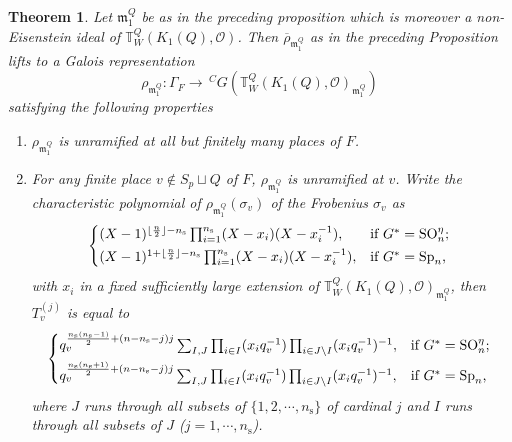 \documentclass[12pt,oneside,reqno]{amsart}
\theoremstyle{plain}
\newtheorem{theorem}{Theorem}[section]
\begin{document}
	
	\begin{theorem}\label{Galois representation valued in Hecke algebra-char=0}
		Let
		$\mathfrak{m}_1^Q$
		be as in the preceding proposition which is moreover
		a non-Eisenstein ideal of
		$\mathbb{T}_W^{Q}(K_1(Q),\mathcal{O})$. 
		Then
		$\overline{\rho}_{\mathfrak{m}_1^Q}$
		as in the preceding
		Proposition
		lifts to a Galois representation
		\[
		\rho_{\mathfrak{m}_1^Q}
		\colon
		\Gamma_F
		\rightarrow
		\,^CG
		\left(
		\mathbb{T}_W^{Q}(K_1(Q),\mathcal{O})_{\mathfrak{m}_1^Q}
		\right)
		\]
		satisfying the following properties
		\begin{enumerate}
			\item 
			$\rho_{\mathfrak{m}_1^Q}$
			is unramified at all but finitely many places of $F$.
			
			
			\item 
			For any finite place
			$v\notin S_p\sqcup Q$ of $F$,
			$\rho_{\mathfrak{m}_1^Q}$
			is unramified at $v$.
			Write the characteristic polynomial
			of
			$\rho_{\mathfrak{m}_1^Q}(\sigma_v)$
			of the Frobenius $\sigma_v$
			as
			\[
			\begin{cases*}
				(X-1)^{\lfloor\frac{n}{2}\rfloor-n_\mathrm{s}}
				\prod_{i=1}^{n_\mathrm{s}}
				(X-x_i)(X-x_i^{-1}),
				&
				if $G^\ast=\mathrm{SO}_n^\eta$;
				\\
				(X-1)^{1+\lfloor\frac{n}{2}\rfloor-n_\mathrm{s}}
				\prod_{i=1}^{n_\mathrm{s}}
				(X-x_i)(X-x_i^{-1}),
				&
				if $G^\ast=\mathrm{Sp}_n$,
			\end{cases*}
			\]
			with
			$x_i$ in a fixed sufficiently large extension of
			$\mathbb{T}_W^{Q}
			(K_1(Q),\mathcal{O})_{\mathfrak{m}_1^Q}$,
			then
			$T_v^{(j)}$
			is equal to
			\[
			\begin{cases*}
				q_v^{\frac{n_\mathrm{s}(n_\mathrm{s}-1)}{2}
					+
					(n-n_\mathrm{s}-j)j}
				\sum_{I,J}
				\prod_{i\in I}
				(x_iq_v^{-1})
				\prod_{i\in J\backslash I}
				(x_iq_v^{-1})^{-1},
				&
				if $G^\ast=\mathrm{SO}_n^\eta$;
				\\
				q_v^{\frac{n_\mathrm{s}(n_\mathrm{s}+1)}{2}
					+
					(n-n_\mathrm{s}-j)j}
				\sum_{I,J}
				\prod_{i\in I}
				(x_iq_v^{-1})
				\prod_{i\in J\backslash I}
				(x_iq_v^{-1})^{-1},
				&
				if $G^\ast=\mathrm{Sp}_n$,
			\end{cases*}
			\]
			where
			$J$ runs through all subsets of
			$\{1,2,\cdots,n_\mathrm{s}\}$
			of cardinal $j$ and
			$I$ runs through all subsets of $J$
			($j=1,\cdots,n_\mathrm{s}$).
			
			
			

\end{enumerate}
\end{theorem}
\end{document}
